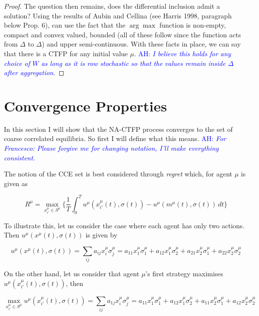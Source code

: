 \documentclass{article}
\theoremstyle{definition}
\newcommand{\ah}[1]{\textcolor{blue}{AH: \textit{#1}}}
\begin{document}
\begin{proof}
		The question then remains, does the differential inclusion admit a solution? Using the
		results of Aubin and Cellina (see Harris 1998, paragraph below Prop. 6), can use the fact
		that the $\arg \max$ function is non-empty, compact and convex valued, bounded (all of
		these follow since the function acts from $\Delta$ to $\Delta$) and upper semi-continuous.
		With these facts in place, we can say that there is a CTFP for any initial value $\mu$.
		\ah{I believe this holds for any choice of $W$ as long as it is row stochastic so that
		the values remain inside $\Delta$ after aggregation}.
	\end{proof}
	
	\newpage
	
	\section*{Convergence Properties}

	In this section I will show that the NA-CTFP process converges to the set of coarse correlated
	equilibria. So first I will define what this means. \ah{For Francesco: Please forgive me for
	changing notation, I'll make everything consistent.}

	The notion of the CCE set is best considered through \emph{regret} which, for agent $\mu$ is given as

	\begin{equation}
		R^{\mu} = \max_{x_{i'}^\mu \in S^\mu} \Big\{ \frac{1}{T} \int_{0}^{T} u^{\mu}(x_{i'}^\mu(t), \sigma(t)) - u^{\mu}(m^\mu(t), \sigma(t)) \, dt \Big\}
	\end{equation}

	To illustrate this, let us consider the case where each agent has only two actions. Then $u^{\mu}(x^\mu(t), \sigma(t))$ is given by
	
	\begin{equation}
		u^{\mu}(x^\mu(t), \sigma(t)) = \sum_{ij} a_{ij} x_i^\mu \sigma_j^\mu = a_{11} x_1^\mu \sigma_1^\mu + a_{12} x_1^\mu \sigma_2^\mu + a_{21} x_2^\mu \sigma_1^\mu + a_{22} x_2^\mu \sigma_2^\mu
	\end{equation}

	On the other hand, let us consider that agent $\mu$'s first strategy maximises $u^{\mu}(x_{i'}^\mu(t), \sigma(t))$, then

	\begin{equation}
		\max_{x_{i'}^\mu \in S^\mu} u^{\mu}(x_{i'}^\mu(t), \sigma(t)) = \sum_{ij} a_{1j} x_i^\mu \sigma_j^\mu = a_{11} x_1^\mu \sigma_1^\mu + a_{12} x_1^\mu \sigma_2^\mu + a_{11} x_2^\mu \sigma_1^\mu + a_{12} x_2^\mu \sigma_2^\mu 
	\end{equation}
\end{document}
